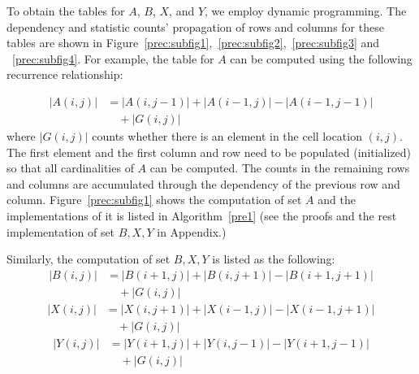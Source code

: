 \documentclass[10pt,journal,cspaper,compsoc]{IEEEtran}
\begin{document}
To obtain the tables for $A$, $B$, $X$, and $Y$, we employ dynamic programming. The dependency and statistic counts' propagation of rows and columns for these tables are shown in Figure~\ref{prec:subfig1},~\ref{prec:subfig2},~\ref{prec:subfig3} and ~\ref{prec:subfig4}. For example, the table for $A$ can be computed using the following recurrence relationship:

\small
\begin{equation}
\begin{split}
|A(i,j)|  &= |A(i,j-1)| + |A(i-1,j)| - |A(i-1,j-1)| \\& \quad + |G(i,j)|
\end{split}
\end{equation}
\normalsize
where $|G(i,j)|$ counts whether there is an element in the cell location $(i,j)$. The first element and the first column and row need to be populated (initialized) so that all cardinalities of $A$ can be computed. The counts in the remaining rows and columns are accumulated through the dependency of the previous row and column. Figure~\ref{prec:subfig1} shows the computation of set $A$ and the implementations of it is listed in Algorithm~\ref{pre1} (see the proofs and the rest implementation of set $B,X,Y$ in Appendix.)

Similarly, the computation of set $B,X,Y$ is listed as the following:
\small
\begin{equation}
\begin{split}
|B(i,j)|  &= |B(i+1,j)| + |B(i,j+1)| - |B(i+1,j+1)| \\& \quad + |G(i,j)|
\end{split}
\end{equation}
\normalsize
\small
\begin{equation}
\begin{split}
|X(i,j)|  &= |X(i,j+1)| + |X(i-1,j)| - |X(i-1,j+1)| \\& \quad + |G(i,j)|
\end{split}
\end{equation}
\normalsize
\small
\begin{equation}
\begin{split}
|Y(i,j)|  &= |Y(i+1,j)| + |Y(i,j-1)| - |Y(i+1,j-1)| \\& \quad + |G(i,j)|
\end{split}
\end{equation}
\normalsize
\end{document}
